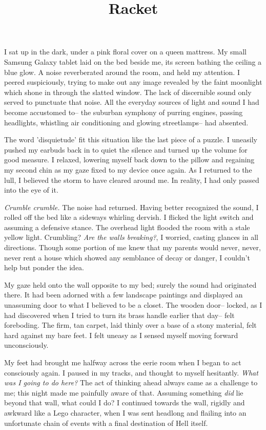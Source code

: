 \documentclass[12pt]{article}
\title{Racket}
\begin{document}
\makeheader
\hspace{0.5in}
I sat up in the dark, under a pink floral cover on a queen mattress.  My small Samsung Galaxy tablet laid on the bed beside me, its screen bathing the ceiling a blue glow.  A noise reverberated around the room, and held my attention.  I peered suspiciously, trying to make out any image revealed by the faint moonlight which shone in through the slatted window.  The lack of discernible sound only served to punctuate that noise.  All the everyday sources of light and sound I had become accustomed to-- the suburban symphony of purring engines, passing headlights, whistling air conditioning and glowing streetlamps-- had absented.

The word 'disquietude' fit this situation like the last piece of a puzzle.  I uneasily pushed my earbuds back in to quiet the silence and turned up the volume for good measure.  I relaxed, lowering myself back down to the pillow and regaining my second chin as my gaze fixed to my device once again.  As I returned to the lull, I believed the storm to have cleared around me.  In reality, I had only passed into the eye of it.

\textit{Crumble crumble.}  The noise had returned.  Having better recognized the sound, I rolled off the bed like a sideways whirling dervish.  I flicked the light switch and assuming a defensive stance.  The overhead light flooded the room with a stale yellow light.  Crumbling?  \textit{Are the walls breaking?}, I worried, casting glances in all directions.  Though some portion of me knew that my parents would never, never, never rent a house which showed any semblance of decay or danger, I couldn't help but ponder the idea.

My gaze held onto the wall opposite to my bed; surely the sound had originated there.  It had been adorned with a few landscape paintings and displayed an unassuming door to what I believed to be a closet.  The wooden door-- locked, as I had discovered when I tried to turn its brass handle earlier that day-- felt foreboding.  The firm, tan carpet, laid thinly over a base of a stony material, felt hard against my bare feet.  I felt uneasy as I sensed myself moving forward unconsciously.

My feet had brought me halfway across the eerie room when I began to act consciously again.  I paused in my tracks, and thought to myself hesitantly.  \textit{What was I going to do here?}  The act of thinking ahead always came as a challenge to me;  this night made me painfully aware of that.  Assuming something \textit{did} lie beyond that wall, what could I do?  I continued towards the wall, rigidly and awkward like a Lego character, when I was sent headlong and flailing into an unfortunate chain of events with a final destination of Hell itself.
\end{document}
